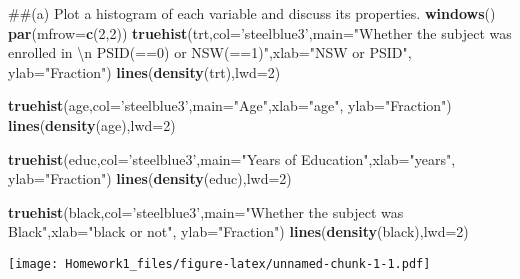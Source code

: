 \documentclass[]{article}
\newenvironment{Shaded}{\begin{snugshade}}{\end{snugshade}}
\newcommand{\KeywordTok}[1]{\textcolor[rgb]{0.13,0.29,0.53}{\textbf{#1}}}
\newcommand{\DataTypeTok}[1]{\textcolor[rgb]{0.13,0.29,0.53}{#1}}
\newcommand{\DecValTok}[1]{\textcolor[rgb]{0.00,0.00,0.81}{#1}}
\newcommand{\CharTok}[1]{\textcolor[rgb]{0.31,0.60,0.02}{#1}}
\newcommand{\StringTok}[1]{\textcolor[rgb]{0.31,0.60,0.02}{#1}}
\newcommand{\NormalTok}[1]{#1}
\begin{document}
\begin{Shaded}
\begin{Highlighting}[]
\NormalTok{##(a) Plot a histogram of each variable and discuss its properties.}
\KeywordTok{windows}\NormalTok{()}
\KeywordTok{par}\NormalTok{(}\DataTypeTok{mfrow=}\KeywordTok{c}\NormalTok{(}\DecValTok{2}\NormalTok{,}\DecValTok{2}\NormalTok{))}
\KeywordTok{truehist}\NormalTok{(trt,}\DataTypeTok{col=}\StringTok{'steelblue3'}\NormalTok{,}\DataTypeTok{main=}\StringTok{"Whether the subject was enrolled in }\CharTok{\textbackslash{}n}\StringTok{ PSID(==0) or NSW(==1)"}\NormalTok{,}\DataTypeTok{xlab=}\StringTok{"NSW or PSID"}\NormalTok{, }\DataTypeTok{ylab=}\StringTok{"Fraction"}\NormalTok{)}
\KeywordTok{lines}\NormalTok{(}\KeywordTok{density}\NormalTok{(trt),}\DataTypeTok{lwd=}\DecValTok{2}\NormalTok{)}

\KeywordTok{truehist}\NormalTok{(age,}\DataTypeTok{col=}\StringTok{'steelblue3'}\NormalTok{,}\DataTypeTok{main=}\StringTok{"Age"}\NormalTok{,}\DataTypeTok{xlab=}\StringTok{"age"}\NormalTok{, }\DataTypeTok{ylab=}\StringTok{"Fraction"}\NormalTok{)}
\KeywordTok{lines}\NormalTok{(}\KeywordTok{density}\NormalTok{(age),}\DataTypeTok{lwd=}\DecValTok{2}\NormalTok{)}

\KeywordTok{truehist}\NormalTok{(educ,}\DataTypeTok{col=}\StringTok{'steelblue3'}\NormalTok{,}\DataTypeTok{main=}\StringTok{"Years of Education"}\NormalTok{,}\DataTypeTok{xlab=}\StringTok{"years"}\NormalTok{, }\DataTypeTok{ylab=}\StringTok{"Fraction"}\NormalTok{)}
\KeywordTok{lines}\NormalTok{(}\KeywordTok{density}\NormalTok{(educ),}\DataTypeTok{lwd=}\DecValTok{2}\NormalTok{)}

\KeywordTok{truehist}\NormalTok{(black,}\DataTypeTok{col=}\StringTok{'steelblue3'}\NormalTok{,}\DataTypeTok{main=}\StringTok{"Whether the subject was Black"}\NormalTok{,}\DataTypeTok{xlab=}\StringTok{"black or not"}\NormalTok{, }\DataTypeTok{ylab=}\StringTok{"Fraction"}\NormalTok{)}
\KeywordTok{lines}\NormalTok{(}\KeywordTok{density}\NormalTok{(black),}\DataTypeTok{lwd=}\DecValTok{2}\NormalTok{)}
\end{Highlighting}
\end{Shaded}

\texttt{[image: Homework1\_files/figure-latex/unnamed-chunk-1-1.pdf]}
\end{document}
